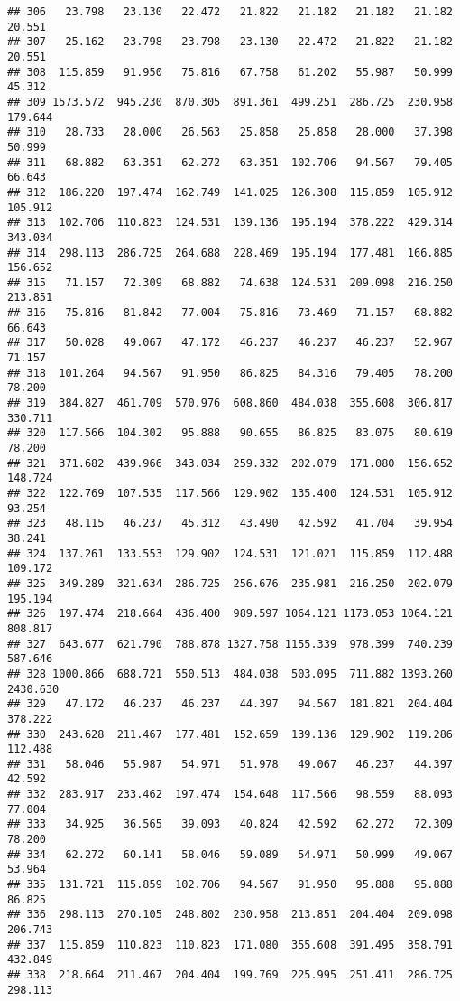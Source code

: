 \documentclass[
]{article}
\begin{document}
\begin{verbatim}
## 306   23.798   23.130   22.472   21.822   21.182   21.182   21.182   20.551
## 307   25.162   23.798   23.798   23.130   22.472   21.822   21.182   20.551
## 308  115.859   91.950   75.816   67.758   61.202   55.987   50.999   45.312
## 309 1573.572  945.230  870.305  891.361  499.251  286.725  230.958  179.644
## 310   28.733   28.000   26.563   25.858   25.858   28.000   37.398   50.999
## 311   68.882   63.351   62.272   63.351  102.706   94.567   79.405   66.643
## 312  186.220  197.474  162.749  141.025  126.308  115.859  105.912  105.912
## 313  102.706  110.823  124.531  139.136  195.194  378.222  429.314  343.034
## 314  298.113  286.725  264.688  228.469  195.194  177.481  166.885  156.652
## 315   71.157   72.309   68.882   74.638  124.531  209.098  216.250  213.851
## 316   75.816   81.842   77.004   75.816   73.469   71.157   68.882   66.643
## 317   50.028   49.067   47.172   46.237   46.237   46.237   52.967   71.157
## 318  101.264   94.567   91.950   86.825   84.316   79.405   78.200   78.200
## 319  384.827  461.709  570.976  608.860  484.038  355.608  306.817  330.711
## 320  117.566  104.302   95.888   90.655   86.825   83.075   80.619   78.200
## 321  371.682  439.966  343.034  259.332  202.079  171.080  156.652  148.724
## 322  122.769  107.535  117.566  129.902  135.400  124.531  105.912   93.254
## 323   48.115   46.237   45.312   43.490   42.592   41.704   39.954   38.241
## 324  137.261  133.553  129.902  124.531  121.021  115.859  112.488  109.172
## 325  349.289  321.634  286.725  256.676  235.981  216.250  202.079  195.194
## 326  197.474  218.664  436.400  989.597 1064.121 1173.053 1064.121  808.817
## 327  643.677  621.790  788.878 1327.758 1155.339  978.399  740.239  587.646
## 328 1000.866  688.721  550.513  484.038  503.095  711.882 1393.260 2430.630
## 329   47.172   46.237   46.237   44.397   94.567  181.821  204.404  378.222
## 330  243.628  211.467  177.481  152.659  139.136  129.902  119.286  112.488
## 331   58.046   55.987   54.971   51.978   49.067   46.237   44.397   42.592
## 332  283.917  233.462  197.474  154.648  117.566   98.559   88.093   77.004
## 333   34.925   36.565   39.093   40.824   42.592   62.272   72.309   78.200
## 334   62.272   60.141   58.046   59.089   54.971   50.999   49.067   53.964
## 335  131.721  115.859  102.706   94.567   91.950   95.888   95.888   86.825
## 336  298.113  270.105  248.802  230.958  213.851  204.404  209.098  206.743
## 337  115.859  110.823  110.823  171.080  355.608  391.495  358.791  432.849
## 338  218.664  211.467  204.404  199.769  225.995  251.411  286.725  298.113

\end{verbatim}
\end{document}
